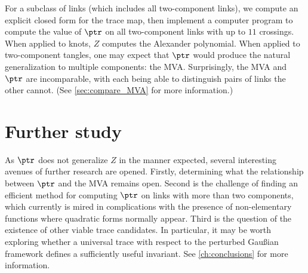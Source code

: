 For a subclass of links (which includes all two-component links), we compute an
explicit closed form for the trace map, then implement a computer program to
compute the value of $\ptr$ on all two-component links with up to $11$
crossings. When applied to knots, $Z$ computes the Alexander
polynomial. When applied to two-component
tangles, one may expect that $\ptr$ would produce the natural generalization to
multiple components: the \ac{MVA}. Surprisingly, the \ac{MVA} and $\ptr$ are
incomparable, with each being able to distinguish pairs of links the other
cannot. (See \cref{sec:compare_MVA} for more information.)

\section{Further study}
As $\ptr$ does not generalize $Z$ in the manner expected, several interesting
avenues of further research are opened. Firstly, determining what the
relationship between $\ptr$ and the \ac{MVA} remains open. Second is the
challenge of finding an efficient method for computing $\ptr$ on links with more
than two components, which currently is mired in complications with
the presence of non-elementary functions where quadratic forms normally appear.
Third is the question of the existence of other viable trace candidates. In
particular, it may be worth exploring whether a universal trace with respect to
the perturbed Gaußian framework defines a sufficiently useful invariant. See
\cref{ch:conclusions} for more information.
